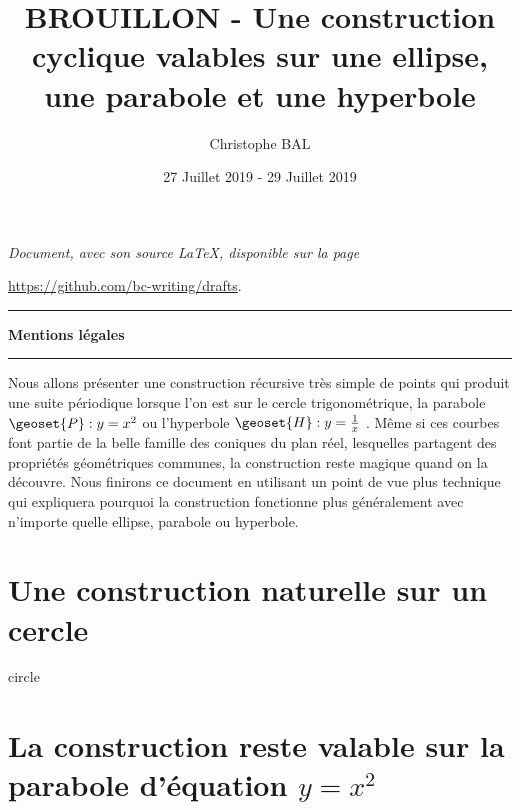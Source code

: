 \documentclass[12pt]{amsart}
\begin{document}
\title{BROUILLON - Une construction cyclique valables sur une ellipse, une parabole et une hyperbole}
\author{Christophe BAL}
\date{27 Juillet 2019 - 29 Juillet 2019}

\maketitle

\begin{center}
	\itshape
	Document, avec son source \LaTeX, disponible sur la page
	
	\url{https://github.com/bc-writing/drafts}.
\end{center}


\bigskip


\begin{center}
	\hrule\vspace{.3em}
	{
		\fontsize{1.35em}{1em}\selectfont
		\textbf{Mentions \og légales \fg}
	}
			
	\vspace{0.45em}
	\doclicenseThis
	\hrule
\end{center}


\setcounter{tocdepth}{2}
\tableofcontents


Nous allons présenter une construction récursive très simple de points qui produit une suite périodique lorsque l'on est sur le cercle trigonométrique, la parabole $\geoset{P} : y = x^2$ ou l'hyperbole $\geoset{H} : y = \frac{1}{x}$ .
Même si ces courbes font partie de la belle famille des coniques du plan réel, lesquelles partagent des propriétés géométriques communes, la construction reste magique quand on la découvre.
Nous finirons ce document en utilisant un point de vue plus technique qui expliquera pourquoi la construction fonctionne plus généralement avec n'importe quelle ellipse, parabole ou hyperbole. 




\section{Une construction naturelle sur un cercle}
\label{circle}

{circle}




\section{\texorpdfstring{La construction reste valable sur la parabole d'équation $y = x^2$}%
                        {La construction reste valable sur la parabole d'équation y = x**2}}
\label{parabola}
\end{document}
